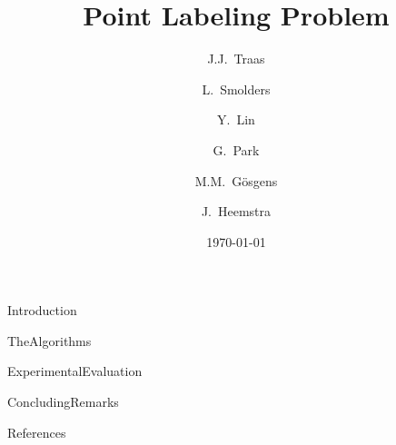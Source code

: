 \documentclass[a4paper,oneside,11pt]{article}
\title{Point Labeling Problem}
\author{J.J.~Traas \and L.~Smolders \and Y.~Lin \and G.~Park \and M.M.~G\"{o}sgens \and J.~Heemstra}
\date{\today}
\begin{document}
\maketitle

{Introduction}

{TheAlgorithms}

{ExperimentalEvaluation}

{ConcludingRemarks}

{References}
\end{document}
